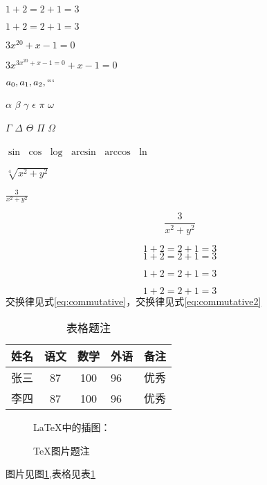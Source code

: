 \documentclass[10pt]{ctexart}%
\begin{document}
	\(1+2=2+1=3\)
	
	\begin{math}
		1+2=2+1=3
	\end{math}
	
	$3x^{20}+x-1=0$
	
	$3x^{3x^{20}+x-1=0}+x-1=0$
	
	$a_0,a_1,a_2,```$
	
	
	$\alpha$  $\beta$  $\gamma$  $\epsilon$  $\pi$  $\omega$  
	
	$\Gamma$  $\Delta$ $\Theta$  $\Pi$  $\Omega$
	
	$\sin$ $\cos$ $\log$  $\arcsin$  $\arccos$ $\ln$
	
	$\sqrt[4]{x^2 + y^2}$
	
	$\frac{3}{x^2 + y^2}$
	
	
	$$ \frac{3}{x^2 + y^2}  $$
	
	\[ 1+2=2+1=3\]
	\begin{displaymath}
		1+2=2+1=3
	\end{displaymath}
	
	\begin{equation}
		1+2=2+1=3\label{eq:commutative}
	\end{equation}
	
	\begin{equation*}
	1+2=2+1=3\label{eq:commutative2}
	\end{equation*}
	交换律见式\ref{eq:commutative}，交换律见式\ref{eq:commutative2}%
	
	
	\begin{table}[h]
		\centering
		\caption{表格题注}\label{tab-score}
		\begin{tabular}{l | c |c| p{1.5cm}| r}
			\hline \hline
			姓名 & 语文 & 数学 & 外语 & 备注 \\
			\hline  \hline
			张三 & 87 & 100 & 96 &优秀\\
			\hline
			李四 & 87 & 100 & 96 &优秀\\
		\end{tabular}
	
	\end{table}
	
	\begin{figure}[htbp]
		
		\LaTeX{}中的插图：
		
		\caption{\TeX 图片题注} \label{fig-lena}
	\end{figure}
	
	图片见图\ref{fig-lena},表格见表\ref{tab-score}%
	
\end{document}
